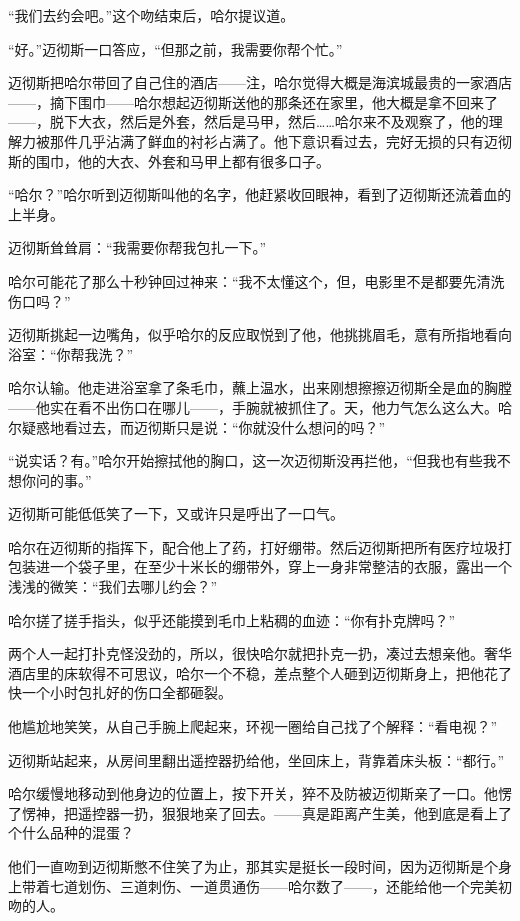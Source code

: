 \documentclass[../main]{subfiles}
\begin{document}
“我们去约会吧。”这个吻结束后，哈尔提议道。

“好。”迈彻斯一口答应，“但那之前，我需要你帮个忙。”

迈彻斯把哈尔带回了自己住的酒店——注，哈尔觉得大概是海滨城最贵的一家酒店——，摘下围巾——哈尔想起迈彻斯送他的那条还在家里，他大概是拿不回来了——，脱下大衣，然后是外套，然后是马甲，然后……哈尔来不及观察了，他的理解力被那件几乎沾满了鲜血的衬衫占满了。他下意识看过去，完好无损的只有迈彻斯的围巾，他的大衣、外套和马甲上都有很多口子。

“哈尔？”哈尔听到迈彻斯叫他的名字，他赶紧收回眼神，看到了迈彻斯还流着血的上半身。

迈彻斯耸耸肩：“我需要你帮我包扎一下。”

哈尔可能花了那么十秒钟回过神来：“我不太懂这个，但，电影里不是都要先清洗伤口吗？”

迈彻斯挑起一边嘴角，似乎哈尔的反应取悦到了他，他挑挑眉毛，意有所指地看向浴室：“你帮我洗？”

哈尔认输。他走进浴室拿了条毛巾，蘸上温水，出来刚想擦擦迈彻斯全是血的胸膛——他实在看不出伤口在哪儿——，手腕就被抓住了。天，他力气怎么这么大。哈尔疑惑地看过去，而迈彻斯只是说：“你就没什么想问的吗？”

“说实话？有。”哈尔开始擦拭他的胸口，这一次迈彻斯没再拦他，“但我也有些我不想你问的事。”

迈彻斯可能低低笑了一下，又或许只是呼出了一口气。

哈尔在迈彻斯的指挥下，配合他上了药，打好绷带。然后迈彻斯把所有医疗垃圾打包装进一个袋子里，在至少十米长的绷带外，穿上一身非常整洁的衣服，露出一个浅浅的微笑：“我们去哪儿约会？”

哈尔搓了搓手指头，似乎还能摸到毛巾上粘稠的血迹：“你有扑克牌吗？”

两个人一起打扑克怪没劲的，所以，很快哈尔就把扑克一扔，凑过去想亲他。奢华酒店里的床软得不可思议，哈尔一个不稳，差点整个人砸到迈彻斯身上，把他花了快一个小时包扎好的伤口全都砸裂。

他尴尬地笑笑，从自己手腕上爬起来，环视一圈给自己找了个解释：“看电视？”

迈彻斯站起来，从房间里翻出遥控器扔给他，坐回床上，背靠着床头板：“都行。”

哈尔缓慢地移动到他身边的位置上，按下开关，猝不及防被迈彻斯亲了一口。他愣了愣神，把遥控器一扔，狠狠地亲了回去。——真是距离产生美，他到底是看上了个什么品种的混蛋？

他们一直吻到迈彻斯憋不住笑了为止，那其实是挺长一段时间，因为迈彻斯是个身上带着七道划伤、三道刺伤、一道贯通伤——哈尔数了——，还能给他一个完美初吻的人。
\end{document}
